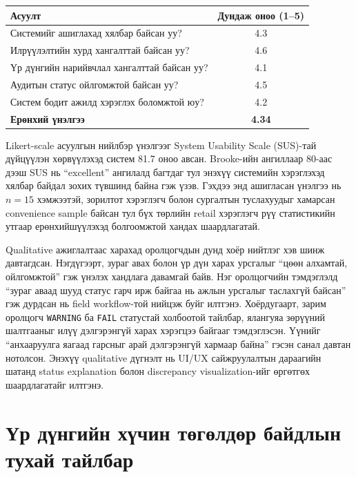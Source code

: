 \begin{table}[H]
\centering
\caption{Хэрэглэгчийн туршилтын үр дүн (n=15)}
\label{tab:user_testing}
\begin{longtable}{|l|c|}
\hline
\textbf{Асуулт} & \textbf{Дундаж оноо (1--5)} \\
\hline
Системийг ашиглахад хялбар байсан уу? & 4.3 \\
\hline
Илрүүлэлтийн хурд хангалттай байсан уу? & 4.6 \\
\hline
Үр дүнгийн нарийвчлал хангалттай байсан уу? & 4.1 \\
\hline
Аудитын статус ойлгомжтой байсан уу? & 4.5 \\
\hline
Систем бодит ажилд хэрэглэх боломжтой юу? & 4.2 \\
\hline
\textbf{Ерөнхий үнэлгээ} & \textbf{4.34} \\
\hline
\end{longtable}
\end{table}

Likert-scale асуулгын нийлбэр үнэлгээг System Usability Scale (SUS)-тай дүйцүүлэн хөрвүүлэхэд систем 81.7 оноо авсан. Brooke-ийн ангиллаар 80-аас дээш SUS нь ``excellent'' ангилалд багтдаг тул энэхүү системийн хэрэглэхэд хялбар байдал зохих түвшинд байна гэж үзэв. Гэхдээ энд ашигласан үнэлгээ нь \(n=15\) хэмжээтэй, зорилтот хэрэглэгч болон сургалтын туслахуудыг хамарсан convenience sample байсан тул бүх төрлийн retail хэрэглэгч рүү статистикийн утгаар ерөнхийшүүлэхэд болгоомжтой хандах шаардлагатай.

Qualitative ажиглалтаас харахад оролцогчдын дунд хоёр нийтлэг хэв шинж давтагдсан. Нэгдүгээрт, зураг авах болон үр дүн харах урсгалыг ``цөөн алхамтай, ойлгомжтой'' гэж үнэлэх хандлага давамгай байв. Нэг оролцогчийн тэмдэглэлд ``зураг аваад шууд статус гарч ирж байгаа нь ажлын урсгалыг таслахгүй байсан'' гэж дурдсан нь field workflow-той нийцэж буйг илтгэнэ. Хоёрдугаарт, зарим оролцогч \texttt{WARNING} ба \texttt{FAIL} статустай холбоотой тайлбар, ялангуяа зөрүүний шалтгааныг илүү дэлгэрэнгүй харах хэрэгцээ байгааг тэмдэглэсэн. Үүнийг ``анхааруулга яагаад гарсныг арай дэлгэрэнгүй хармаар байна'' гэсэн санал давтан нотолсон. Энэхүү qualitative дүгнэлт нь UI/UX сайжруулалтын дараагийн шатанд status explanation болон discrepancy visualization-ийг өргөтгөх шаардлагатайг илтгэнэ.

\section{Үр дүнгийн хүчин төгөлдөр байдлын тухай тайлбар}

